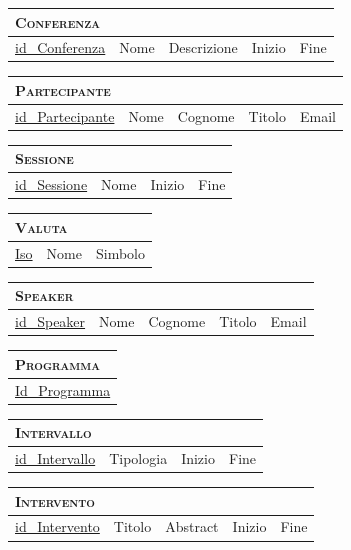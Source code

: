 	\begin{tabular}{|l|l|l|l|l|}
		\multicolumn{5}{l}{\textsc{Conferenza}} \\ \hline
		\underline{id\_Conferenza} & Nome & Descrizione & Inizio & Fine \\ \hline
	\end{tabular}


	\begin{tabular}{|l|l|l|l|l|}
		\multicolumn{5}{l}{\textsc{Partecipante}} \\ \hline
		\underline{id\_Partecipante} & Nome & Cognome & Titolo & Email \\ \hline
	\end{tabular}


	\begin{tabular}{|l|l|l|l|}
		\multicolumn{4}{l}{\textsc{Sessione}} \\ \hline
		\underline{id\_Sessione} & Nome & Inizio & Fine \\ \hline
	\end{tabular}


	\begin{tabular}{|l|l|l|}
		\multicolumn{3}{l}{\textsc{Valuta}} \\ \hline
		\underline{Iso} & Nome & Simbolo \\ \hline
	\end{tabular}


	\begin{tabular}{|l|l|l|l|l|}
		\multicolumn{5}{l}{\textsc{Speaker}} \\ \hline
		\underline{id\_Speaker} & Nome & Cognome & Titolo & Email \\ \hline
	\end{tabular}


	\begin{tabular}{|l|}
		\multicolumn{1}{l}{\textsc{Programma}} \\ \hline
		\underline{Id\_Programma} \\ \hline
	\end{tabular}


	\begin{tabular}{|l|l|l|l|}
		\multicolumn{4}{l}{\textsc{Intervallo}} \\ \hline
		\underline{id\_Intervallo} & Tipologia & Inizio & Fine \\ \hline
	\end{tabular}


	\begin{tabular}{|l|l|l|l|l|}
		\multicolumn{5}{l}{\textsc{Intervento}} \\ \hline
		\underline{id\_Intervento} & Titolo & Abstract & Inizio & Fine \\ \hline
	\end{tabular}



